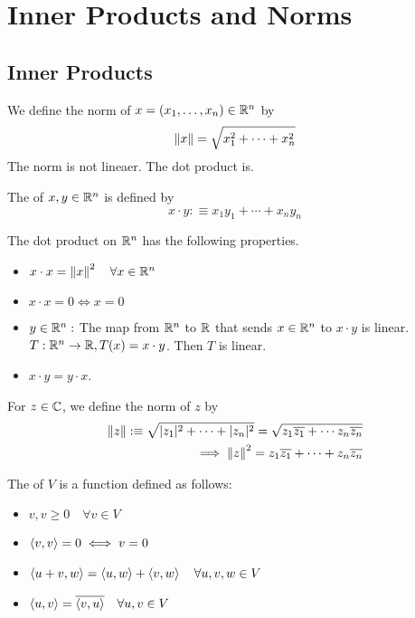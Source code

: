\section{Inner Products and Norms}

\subsection{Inner Products}
We define the norm of $x=(x_1, \ldots, x_n) \in \mathbb{R}^n$ by
\begin{equation}
  \left \lVert x \right \rVert = \sqrt{x_1^2 + \cdots + x_n^2}
\end{equation}
The norm is not lineaer. The dot product is.

\begin{mydef} 
  The  of $x,y \in \mathbb{R}^n$ is defined by
  \begin{equation}
    x \cdot y :\equiv x_1 y_1 + \cdots + x_n y_n
  \end{equation}
\end{mydef}

The dot product on $\mathbb{R}^n$ has the following properties.
\begin{itemize}
  \item $x \cdot x = \left \lVert x \right \rVert^2 \quad \forall x \in \mathbb{R}^n$ 
  \item $x \cdot x = 0 \iff x= 0$
  \item $y\in \mathbb{R}^n:$ The map from $\mathbb{R}^n$ to $\mathbb{R}$ that sends $x \in \mathbb{R}^n$ to $x\cdot y$ is linear. \\
  $T: \mathbb{R}^n \to \mathbb{R}, T(x) = x \cdot y$. Then $T$ is linear.
  \item $x \cdot y = y \cdot x$.
\end{itemize}

For $z \in \mathbb{C}$, we define the norm of $z$ by
\begin{equation}
  \begin{aligned}
    \left \lVert z \right \rVert :\equiv \sqrt{ |z_1|^2 + \cdots + |z_n|^2} = \sqrt{ z_1 \overline {z_1} + \cdots z_n \overline {z_n}} \\
    \implies \left \lVert z \right \rVert^2 = z_1 \overline{z_1} + \cdots + z_n \overline{z_n}
  \end{aligned}
\end{equation}

\begin{mydef} 
  The  of $V$ is a function defined as follows:
  \begin{itemize}
    \item {} $
    {v,v} \geq 0 \quad \forall v \in V$
    \item {} $\left \langle v, v \right \rangle = 0 \iff v=0$
    \item {} $\left \langle u+v, w \right \rangle=\left \langle u, w \right \rangle+\left \langle v, w \right \rangle \quad \forall u,v,w \in V$
    \item {} $\left \langle u, v \right \rangle = \overline{\left \langle v, u \right \rangle} \quad \forall u, v \in V$ 
  \end{itemize}
\end{mydef}

